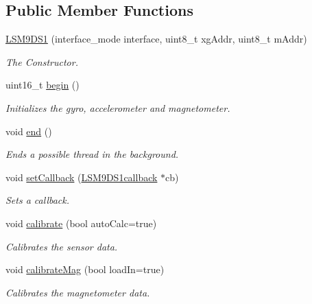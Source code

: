 \subsection*{Public Member Functions}
\begin{DoxyCompactItemize}
\item 
\hyperlink{classLSM9DS1_ab62923063ffc49dca82e6f311c5c8764}{L\+S\+M9\+D\+S1} (interface\+\_\+mode interface, uint8\+\_\+t xg\+Addr, uint8\+\_\+t m\+Addr)
\begin{DoxyCompactList}\small\item\em The Constructor. \end{DoxyCompactList}\item 
uint16\+\_\+t \hyperlink{classLSM9DS1_a8728e560c76bd120b3711af15a6ecbd6}{begin} ()
\begin{DoxyCompactList}\small\item\em Initializes the gyro, accelerometer and magnetometer. \end{DoxyCompactList}\item 
\mbox{\label{classLSM9DS1_ae1948644d70a0356f3da4949023afb31}} 
void \hyperlink{classLSM9DS1_ae1948644d70a0356f3da4949023afb31}{end} ()
\begin{DoxyCompactList}\small\item\em Ends a possible thread in the background. \end{DoxyCompactList}\item 
void \hyperlink{classLSM9DS1_a3102ea02c253af39e3b43ee55b94d716}{set\+Callback} (\hyperlink{classLSM9DS1callback}{L\+S\+M9\+D\+S1callback} $\ast$cb)
\begin{DoxyCompactList}\small\item\em Sets a callback. \end{DoxyCompactList}\item 
void \hyperlink{classLSM9DS1_a97939cb15fcb7e33abcd6d3a9230d943}{calibrate} (bool auto\+Calc=true)
\begin{DoxyCompactList}\small\item\em Calibrates the sensor data. \end{DoxyCompactList}\item 
void \hyperlink{classLSM9DS1_afb45f0bcbcbeb15d4bd1a28821b24d14}{calibrate\+Mag} (bool load\+In=true)
\begin{DoxyCompactList}\small\item\em Calibrates the magnetometer data. \end{DoxyCompactList}\item 

\end{DoxyCompactItemize}
